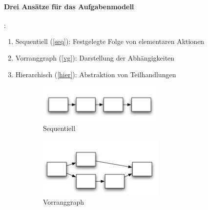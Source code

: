 \paragraph*{Drei Ansätze für das Aufgabenmodell}:
\begin{enumerate}
\item Sequentiell (\autoref{seq}): Festgelegte Folge von elementaren Aktionen 
\item Vorranggraph (\autoref{vg}): Darstellung der Abhängigkeiten
\item Hierarchisch (\autoref{hier}): Abstraktion von Teilhandlungen
\end{enumerate}
\begin{figure}[h!]
	\centering
	\begin{subfigure}{.25\textwidth}
		\includegraphics[width=\textwidth]{figures/ch02_ans.png}
		\caption{Sequentiell}
		\label{seq}
	\end{subfigure}
	\begin{subfigure}{.25\textwidth}
		\includegraphics[width=\textwidth]{figures/ch02_ans1.png}
		\caption{Vorranggraph}
		\label{vg}
	\end{subfigure}
		\begin{subfigure}{.25\textwidth}

\end{subfigure}
\end{figure}
